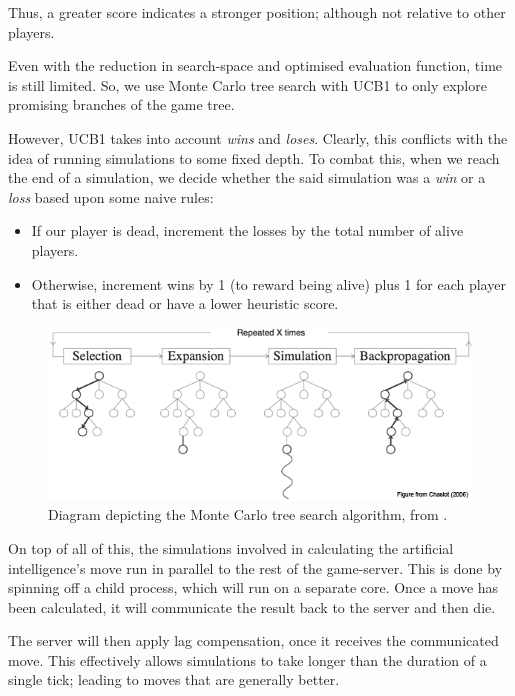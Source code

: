 \documentclass{standalone}
\begin{document}
		Thus, a greater score indicates a stronger position; although not relative to other players.

		Even with the reduction in search-space and optimised evaluation function, time is still limited. So, we use Monte Carlo tree search \parencite{MonteCarloTreeSearch} with UCB1 to only explore promising branches of the game tree.

		However, UCB1 takes into account \emph{wins} and \emph{loses}. Clearly, this conflicts with the idea of running simulations to some fixed depth. To combat this, when we reach the end of a simulation, we decide whether the said simulation was a \emph{win} or a \emph{loss} based upon some naive rules:
		\begin{itemize}
			\item If our player is dead, increment the losses by the total number of alive players.
			\item Otherwise, increment wins by 1 (to reward being alive) plus 1 for each player that is either dead or have a lower heuristic score.
		\end{itemize}

		\begin{figure}[!htbp]
			\centering
			\includegraphics[width=.8\textwidth]{resources/images/mcts.png}
			\caption{Diagram depicting the Monte Carlo tree search algorithm, from \parencite{MonteCarloTreeSearchDiagram}.}
		\end{figure}

		On top of all of this, the simulations involved in calculating the artificial intelligence's move run in parallel to the rest of the game-server. This is done by spinning off a child process, which will run on a separate core. Once a move has been calculated, it will communicate the result back to the server and then die.

		The server will then apply lag compensation, once it receives the communicated move. This effectively allows simulations to take longer than the duration of a single tick; leading to moves that are generally better.
\end{document}
